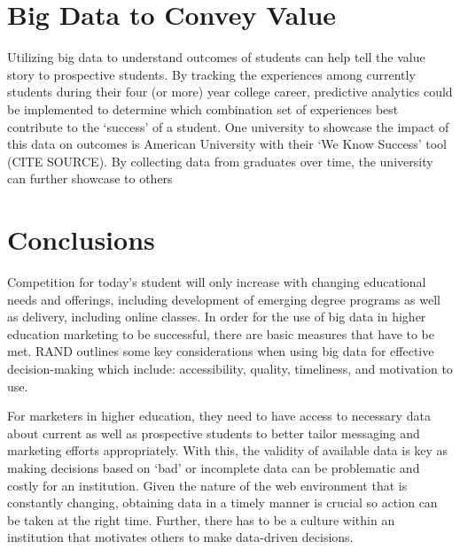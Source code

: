 \documentclass[sigconf]{acmart}
\begin{document}
\section{Big Data to Convey Value}
Utilizing big data to understand outcomes of students can help tell the value story to prospective students. By tracking the experiences among currently students during their four (or more) year college career, predictive analytics could be implemented to determine which combination set of experiences best contribute to the ‘success’ of  a student. One university to showcase the impact of this data on outcomes is American University with their ‘We Know Success’ tool (CITE SOURCE). By collecting data from graduates over time, the university can further showcase to others 








\section{Conclusions}

Competition for today’s student will only increase with changing educational needs and offerings, including development of emerging degree programs as well as delivery, including online classes. In order for the use of big data in higher education marketing to be successful, there are basic measures that have to be met. RAND outlines some key considerations when using big data for effective decision-making which include: accessibility, quality, timeliness, and motivation to use. 

For marketers in higher education, they need to have access to necessary data about current as well as prospective students to better tailor messaging and marketing efforts appropriately. With this, the validity of available data is key as making decisions based on ‘bad’ or incomplete data can be problematic and costly for an institution. Given the nature of the web environment that is constantly changing, obtaining data in a timely manner is crucial so action can be taken at the right time. Further, there has to be a culture within an institution that motivates others to make data-driven decisions.   





 
\end{document}
